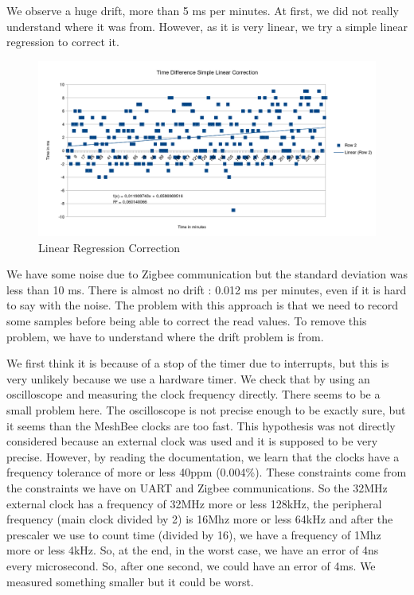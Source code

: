 We observe a huge drift, more than 5 ms per minutes. At first, we did not really understand where it was from. However, as it is very linear, we try a simple linear regression to correct it.

\begin{figure}[ht]
\centering
\includegraphics[width=.6\linewidth]{time_difference_simple_regression_server_meshbee}
\caption[Linear Regression Correction]{\label{f:time_difference_simple_regression_server_meshbee}Linear Regression Correction}
\end{figure}

We have some noise due to Zigbee communication but the standard deviation was less than 10 ms. There is almost no drift : 0.012 ms per minutes, even if it is hard to say with the noise. The problem with this approach is that we need to record some samples before being able to correct the read values. To remove this problem, we have to understand where the drift problem is from.

We first think it is because of a stop of the timer due to interrupts, but this is very unlikely because we use a hardware timer. We check that by using an oscilloscope and measuring the clock frequency directly. There seems to be a small problem here. The oscilloscope is not precise enough to be exactly sure, but it seems than the MeshBee clocks are too fast. This hypothesis was not directly considered because an external clock was used and it is supposed to be very precise. However, by reading the documentation, we learn that the clocks have a frequency tolerance of more or less 40ppm (0.004\%). These constraints come from the constraints we have on UART and Zigbee communications. So the 32MHz external clock has a frequency of 32MHz more or less 128kHz, the peripheral frequency (main clock divided by 2) is 16Mhz more or less 64kHz and after the prescaler we use to count time (divided by 16), we have a frequency of 1Mhz more or less 4kHz. So, at the end, in the worst case, we have an error of 4ns every microsecond. So, after one second, we could have an error of 4ms. We measured something smaller but it could be worst.

